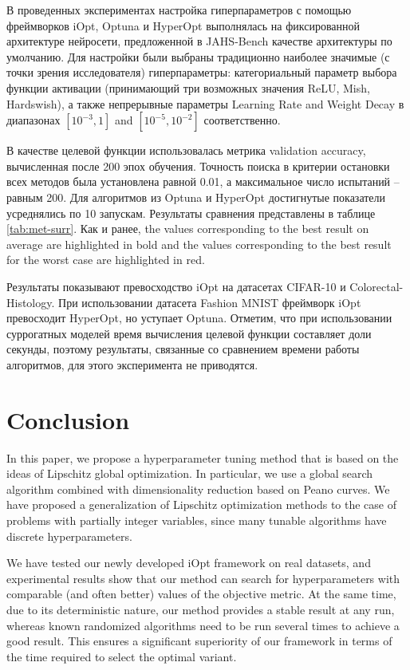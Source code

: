 \documentclass[iicol]{sn-jnl}
\theoremstyle{thmstyleone}%
\theoremstyle{thmstyletwo}%
\theoremstyle{thmstylethree}%
\begin{document}
В проведенных экспериментах настройка гиперпараметров с помощью фреймворков iOpt, Optuna и HyperOpt выполнялась на фиксированной архитектуре нейросети, предложенной в JAHS-Bench качестве архитектуры по умолчанию. Для настройки были выбраны традиционно наиболее значимые (с точки зрения исследователя) гиперпараметры: категориальный параметр выбора функции активации (принимающий три возможных значения ReLU, Mish, Hardswish), а также непрерывные параметры Learning Rate and Weight Decay в диапазонах $[10^{-3},1]$ and $[10^{-5},10^{-2}]$ соответственно. 

В качестве целевой функции использовалась метрика validation accuracy, вычисленная после 200 эпох обучения. Точность поиска в критерии остановки всех методов была установлена равной 0.01, а максимальное число испытаний – равным 200. Для алгоритмов из Optuna и HyperOpt достигнутые показатели усреднялись по 10 запускам. Результаты сравнения представлены в таблице \ref{tab:met-surr}. Как и ранее, the values corresponding to the best result on average are highlighted in bold and the values corresponding to the best result for the worst case are highlighted in red.

Результаты показывают превосходство iOpt на датасетах CIFAR-10 и Colorectal-Histology. При использовании датасета Fashion MNIST фреймворк iOpt превосходит HyperOpt, но уступает Optuna. Отметим, что при использовании суррогатных моделей время вычисления целевой функции составляет доли секунды, поэтому результаты, связанные со сравнением времени работы алгоритмов, для этого эксперимента не приводятся.


\section{Conclusion}\label{sec13}

In this paper, we propose a hyperparameter tuning method that is based on the ideas of Lipschitz global optimization. In particular, we use a global search algorithm combined with dimensionality reduction based on Peano curves. We have proposed a generalization of Lipschitz optimization methods to the case of problems with partially integer variables, since many tunable algorithms have discrete hyperparameters.

We have tested our newly developed iOpt framework on real datasets, and experimental results show that our method can search for hyperparameters with comparable (and often better) values of the objective metric. At the same time, due to its deterministic nature, our method provides a stable result at any run, whereas known randomized algorithms need to be run several times to achieve a good result. This ensures a significant superiority of our framework in terms of the time required to select the optimal variant.
\end{document}
